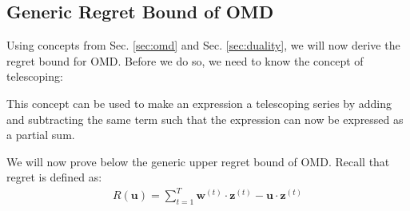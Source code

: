 \documentclass[11pt]{article}
\begin{document}
\subsection{Generic Regret Bound of OMD}
\label{sec:regret}
Using concepts from Sec. \ref{sec:omd} and Sec. \ref{sec:duality}, we will now derive the regret bound for OMD. Before we do so, we need to know the concept of telescoping:


\normalfont
This concept can be used to make an expression a telescoping series by adding and subtracting the same term such that the expression can now be expressed as a partial sum.

We will now prove below the generic upper regret bound of OMD. Recall that regret is defined as:
\begin{align}
\label{eq:14}
    R(\textbf{u}) = \sum_{t=1}^{T} \textbf{w}^{(t)} \cdot \textbf{z}^{(t)} - \textbf{u} \cdot \textbf{z}^{(t)}
\end{align}

\end{document}
